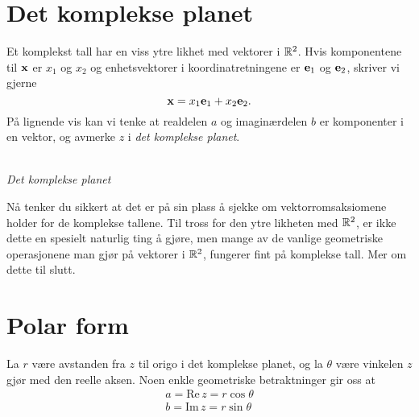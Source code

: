 \section*{Det komplekse planet}

Et komplekst tall har en viss ytre likhet med vektorer i $\mathbb{R}^2$. Hvis komponentene til $\mathbf{x}$ er $x_1$ og $x_2$ og enhetsvektorer i koordinatretningene er $\mathbf{e}_1$ og $\mathbf{e}_2$, skriver vi gjerne
\[
\mathbf{x}=x_1 \mathbf{e}_1+x_2 \mathbf{e}_2.
\]
På lignende vis kan vi tenke at realdelen $a$ og imaginærdelen $b$ er komponenter i en vektor, og avmerke $z$ i \emph{det komplekse planet}.
\begin{center}
\\
{\small \textit{Det komplekse planet}}
\end{center}
Nå tenker du sikkert at det er på sin plass å sjekke om vektorromsaksiomene holder for de komplekse tallene. Til tross for den ytre likheten med $\mathbb{R}^2$, er ikke dette en spesielt naturlig ting å gjøre, men mange av de vanlige geometriske operasjonene man gjør på vektorer i $\mathbb{R}^2$, fungerer fint på komplekse tall. Mer om dette til slutt. 

\section*{Polar form}
La $r$ være avstanden fra $z$ til origo i det komplekse planet, og la $\theta$ være vinkelen $z$ gjør med den reelle aksen. Noen enkle geometriske betraktninger gir oss at 
\begin{align*}
a=\text{Re}\, z = r\cos \theta \\
b=\text{Im}\, z = r\sin \theta \\
\end{align*}

